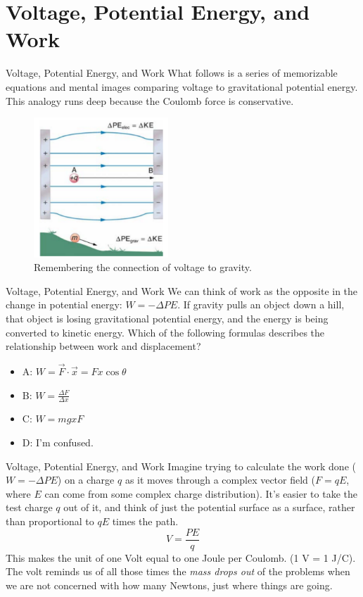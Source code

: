 \documentclass{beamer}
\begin{document}
\section{Voltage, Potential Energy, and Work}

\begin{frame}{Voltage, Potential Energy, and Work}
\small
What follows is a series of memorizable equations and mental images comparing voltage to gravitational potential energy.  This analogy runs deep because the Coulomb force is conservative.
\begin{figure}
\centering
\includegraphics[width=0.45\textwidth]{figures/hill.png}
\caption{\label{fig:hill} Remembering the connection of voltage to gravity.}
\end{figure}
\end{frame}

\begin{frame}{Voltage, Potential Energy, and Work}
We can think of work as the opposite in the change in potential energy: $W = -\Delta PE$.  If gravity pulls an object down a hill, that object is losing gravitational potential energy, and the energy is being converted to kinetic energy.  Which of the following formulas describes the relationship between work and displacement?
\begin{itemize}
\item A: $W = \vec{F} \cdot \vec{x} = Fx\cos\theta$
\item B: $W = \frac{\Delta F}{\Delta x}$
\item C: $W = mgx F$
\item D: I'm confused.
\end{itemize}
\end{frame}

\begin{frame}{Voltage, Potential Energy, and Work}
Imagine trying to calculate the work done ($W = -\Delta PE$) on a charge $q$ as it moves through a complex vector field ($F = qE$, where $E$ can come from some complex charge distribution).  It's easier to take the test charge $q$ out of it, and think of just the potential surface as a surface, rather than proportional to $qE$ times the path.
\begin{equation}
V = \frac{PE}{q}
\end{equation}
This makes the unit of one Volt equal to one Joule per Coulomb. (1 V = 1 J/C).  The volt reminds us of all those times the \textit{mass drops out} of the problems when we are not concerned with how many Newtons, just where things are going.
\end{frame}
\end{document}
